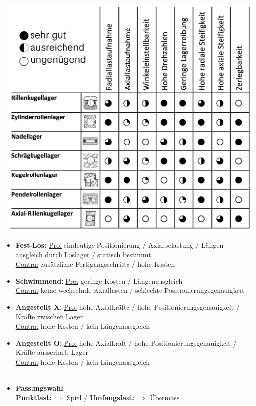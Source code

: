 \begin{center}
    \includegraphics[width = 0.9\linewidth]{MAEIP_Lagerungen}
\end{center}
\begin{scriptsize}
    \begin{itemize}
        \item \textbf{Fest-Los:} \underline{Pro:} eindeutige Positionierung / Axialbelastung / Längen-\\ausgleich durch Loslager / statisch bestimmt
        \\ \underline{Contra:} zusätzliche Fertigungsschritte / hohe Kosten
        \item \textbf{Schwimmend:} \underline{Pro:} geringe Kosten / Längenausgleich
        \\ \underline{Contra:} keine wechselnde Axiallasten / schlechte Positionierungsgenauigkeit
        \item \textbf{Angestellt X:} \underline{Pro:} hohe Axialkräfte / hohe Positionierungsgenauigkeit / Kräfte zwischen Lager 
        \\ \underline{Contra:} hohe Kosten / kein Längenausgleich
        \item \textbf{Angestellt O:} \underline{Pro:} hohe Axialkraft / hohe Positionierungsgenauigkeit / Kräfte ausserhalb Lager
        \\ \underline{Contra:} hohe Kosten / kein Längenausgleich
        \\~\\
        \item \textbf{Passungswahl:} 
        \\ \textbf{Punktlast:} $\Rightarrow$ Spiel / \textbf{Umfangslast:} $\Rightarrow$ Übermass 
    \end{itemize} 
\end{scriptsize}